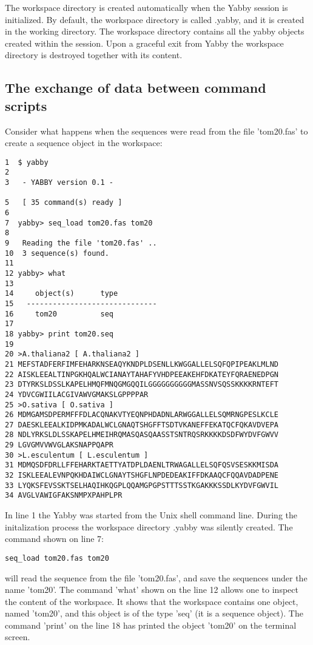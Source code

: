 The workspace directory is created automatically when the Yabby
session is initialized. By default, the workspace directory is
called .yabby, and it is created in the working directory. The
workspace directory contains all the yabby objects created within
the session. Upon a graceful exit from Yabby the workspace directory
is destroyed together with its content.

\subsection{The exchange of data between command scripts}

Consider what happens when the sequences were read from the file
'tom20.fas' to create a sequence object in the workspace:

\begin{verbatim}
1  $ yabby
2 
3   - YABBY version 0.1 -

5   [ 35 command(s) ready ]
6 
7  yabby> seq_load tom20.fas tom20
8  
9   Reading the file 'tom20.fas' ..
10  3 sequence(s) found.
11 
12 yabby> what
13 
14     object(s)      type
15   ------------------------------
16     tom20          seq   
17 
18 yabby> print tom20.seq
19
20 >A.thaliana2 [ A.thaliana2 ]
21 MEFSTADFERFIMFEHARKNSEAQYKNDPLDSENLLKWGGALLELSQFQPIPEAKLMLND
22 AISKLEEALTINPGKHQALWCIANAYTAHAFYVHDPEEAKEHFDKATEYFQRAENEDPGN
23 DTYRKSLDSSLKAPELHMQFMNQGMGQQILGGGGGGGGGGMASSNVSQSSKKKKRNTEFT
24 YDVCGWIILACGIVAWVGMAKSLGPPPPAR
25 >O.sativa [ O.sativa ]
26 MDMGAMSDPERMFFFDLACQNAKVTYEQNPHDADNLARWGGALLELSQMRNGPESLKCLE
27 DAESKLEEALKIDPMKADALWCLGNAQTSHGFFTSDTVKANEFFEKATQCFQKAVDVEPA
28 NDLYRKSLDLSSKAPELHMEIHRQMASQASQAASSTSNTRQSRKKKKDSDFWYDVFGWVV
29 LGVGMVVWVGLAKSNAPPQAPR
30 >L.esculentum [ L.esculentum ]
31 MDMQSDFDRLLFFEHARKTAETTYATDPLDAENLTRWAGALLELSQFQSVSESKKMISDA
32 ISKLEEALEVNPQKHDAIWCLGNAYTSHGFLNPDEDEAKIFFDKAAQCFQQAVDADPENE
33 LYQKSFEVSSKTSELHAQIHKQGPLQQAMGPGPSTTTSSTKGAKKKSSDLKYDVFGWVIL
34 AVGLVAWIGFAKSNMPXPAHPLPR
\end{verbatim}

In line 1 the Yabby was started from the Unix shell command line.
During the initalization process the workspace directory .yabby
was silently created. The command shown on line 7:

\begin{verbatim}
seq_load tom20.fas tom20
\end{verbatim}

will read the sequence from the file 'tom20.fas', and save the sequences
under the name 'tom20'. The command 'what' shown on the line 12 allows
one to inspect the content of the workspace. It shows that the workspace
contains one object, named 'tom20', and this object is of the type 'seq'
(it is a sequence object).  The command 'print' on the line 18 has
printed the object 'tom20' on the terminal screen.

